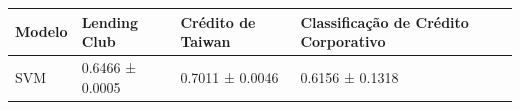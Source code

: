 \begin{tabular}{llll}
\toprule
Modelo & Lending Club & Crédito de Taiwan & Classificação de Crédito Corporativo \\
\midrule
SVM & 0.6466 ± 0.0005 & 0.7011 ± 0.0046 & 0.6156 ± 0.1318 \\
\bottomrule
\end{tabular}
